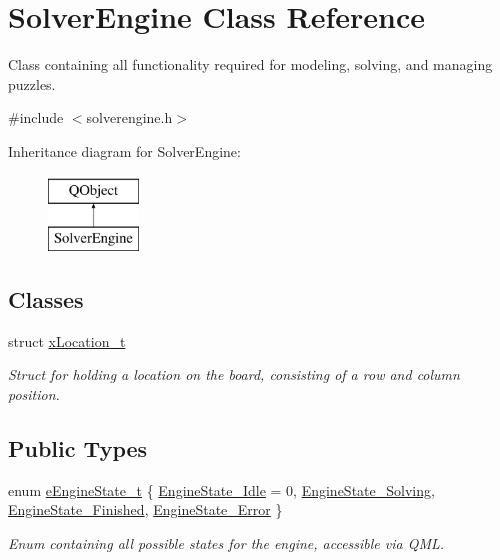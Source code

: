 \hypertarget{class_solver_engine}{}\section{Solver\+Engine Class Reference}
\label{class_solver_engine}


Class containing all functionality required for modeling, solving, and managing puzzles.  




{\ttfamily \#include $<$solverengine.\+h$>$}

Inheritance diagram for Solver\+Engine\+:\begin{figure}[H]
\begin{center}
\leavevmode
\includegraphics[height=2.000000cm]{class_solver_engine}
\end{center}
\end{figure}
\subsection*{Classes}
\begin{DoxyCompactItemize}
\item 
struct \mbox{\hyperlink{struct_solver_engine_1_1x_location__t}{x\+Location\+\_\+t}}
\begin{DoxyCompactList}\small\item\em Struct for holding a location on the board, consisting of a row and column position. \end{DoxyCompactList}\end{DoxyCompactItemize}
\subsection*{Public Types}
\begin{DoxyCompactItemize}
\item 
enum \mbox{\hyperlink{class_solver_engine_acd25f3521e492d4aa924f922396bf02c}{e\+Engine\+State\+\_\+t}} \{ \mbox{\hyperlink{class_solver_engine_acd25f3521e492d4aa924f922396bf02ca5a2e2dc92b4d1e18ad4143fc1482653c}{Engine\+State\+\_\+\+Idle}} = 0, 
\mbox{\hyperlink{class_solver_engine_acd25f3521e492d4aa924f922396bf02ca75636af1a8b5276f1e7545f6ebb0fd94}{Engine\+State\+\_\+\+Solving}}, 
\mbox{\hyperlink{class_solver_engine_acd25f3521e492d4aa924f922396bf02ca406c53dc180a55ca68b29bd0ca9cd2ed}{Engine\+State\+\_\+\+Finished}}, 
\mbox{\hyperlink{class_solver_engine_acd25f3521e492d4aa924f922396bf02cacb5e7043b14126f8a641f9ec98a481f6}{Engine\+State\+\_\+\+Error}}
 \}
\begin{DoxyCompactList}\small\item\em Enum containing all possible states for the engine, accessible via Q\+ML. \end{DoxyCompactList}\end{DoxyCompactItemize}
